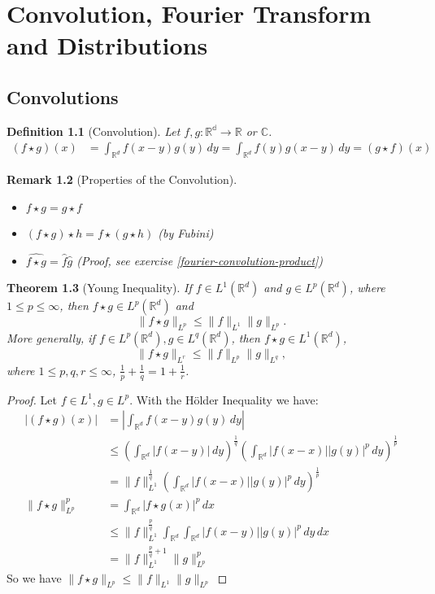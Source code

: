 \documentclass{report}
\theoremstyle{tommy}
\newtheorem{defn}{Definition}
\newtheorem{thm}[defn]{Theorem}
\newtheorem{rem}[defn]{Remark}
\begin{document}
  \chapter{Convolution, Fourier Transform and Distributions}

  \section{Convolutions}
  \begin{defn}[Convolution]
    Let \(f, g: \mathbb{{R}^d \to \mathbb{R}}\) or \(\mathbb{C}\).
    \begin{align*}
      (f \star g)(x)
      &= \int_{\mathbb{R}^d} f(x-y) g(y) \, dy
      = \int_{\mathbb{R}^d} f(y) g(x-y) \, dy 
      = (g \star f)(x)
    \end{align*}
  \end{defn}

  \begin{rem}[Properties of the Convolution]\
    \begin{itemize}
      \item \(f \star g = g \star f\)
      \item \((f \star g) \star h = f \star (g \star h)\) (by Fubini)
      \item \(\widehat{f \star g} = \hat f \hat g\) (Proof, see exercise \ref{fourier-convolution-product})
    \end{itemize}
  \end{rem}

  \begin{thm}[Young Inequality]\label{young}
    If \(f \in L^1(\mathbb{R}^d)\) and \(g \in L^p(\mathbb{R}^d)\), where \(1 \le p \le \infty\), then \(f \star g \in L^p(\mathbb{R}^d)\) and \[\|f \star g \|_{L^p} \le \|f\|_{L^1} \|g\|_{L^p}.\] More generally, if \(f \in L^p(\mathbb{R}^d), g \in L^q(\mathbb{R}^d)\), then \(f \star g \in L^1(\mathbb{R}^d)\), \[\| f \star g\|_{L^r} \le \|f\|_{L^p} \|g\|_{L^q},\]where \(1 \le p, q, r \le \infty\), \(\frac{1}{p} + \frac{1}{q} = 1 + \frac{1}{r}\).
  \end{thm}

  \begin{proof}
    Let \(f \in L^1, g \in L^p\). With the Hölder Inequality we have:
    \begin{align*}
      |(f \star g)(x)| 
      &= \left| \int_{\mathbb{R}^d} f(x-y)g(y) \, dy \right| \\
      &\le \left(\int_{\mathbb{R}^d} |f(x-y)| \, dy\right)^{\frac{1}{q}} \left(\int_{\mathbb{R}^d} |f(x-x)| |g(y)|^p \, dy \right)^{\frac{1}{p}} \\
      &= \| f \|_{L^1}^{\frac{1}{q}} \left(\int_{\mathbb{R}^d} |f(x-x)| |g(y)|^p \, dy \right)^{\frac{1}{p}} \\
      \|f \star g\|_{L^p}^p
      &= \int_{\mathbb{R}^d} |f \star g(x)|^p \, dx \\
      &\le \|f\|_{L^1}^{\frac{p}{q}} \int_{\mathbb{R}^d} \int_{\mathbb{R}^d} |f(x-y)||g(y)|^p \, dy \, dx \\
      &= \| f \|_{L^1}^{\frac{p}{q} + 1} \|g\|_{L^p}^p
    \end{align*}
    So we have \(\| f \star g \|_{L^p} \le \|f\|_{L^1} \|g\|_{L^p}\)
  \end{proof}
\end{document}
